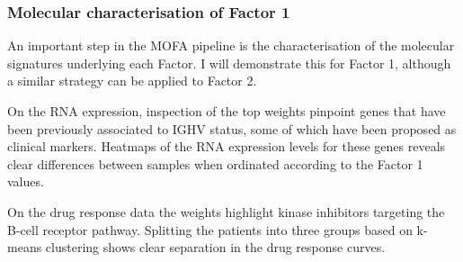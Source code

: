 



\subsubsection{Molecular characterisation of Factor 1}

An important step in the MOFA pipeline is the characterisation of the molecular signatures underlying each Factor. I will demonstrate this for Factor 1, although a similar strategy can be applied to Factor 2.

On the RNA expression, inspection of the top weights pinpoint genes that have been previously associated to IGHV status, some of which have been proposed as clinical markers\cite{Vasconcelos2005,Morabito2015}. Heatmaps of the RNA expression levels for these genes reveals clear differences between samples when ordinated according to the Factor 1 values.

On the drug response data the weights highlight kinase inhibitors targeting the B-cell receptor pathway. Splitting the patients into three groups based on k-means clustering shows clear separation in the drug response curves.

